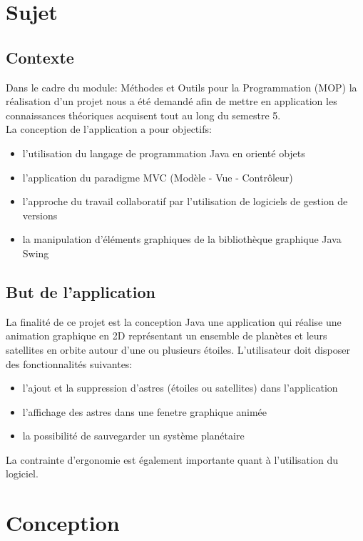 \documentclass[a4paper,10pt]{article}
\begin{document}
\newpage
\tableofcontents
\newpage

\section{Sujet}
\subsection{Contexte}
Dans le cadre du module: Méthodes et Outils pour la Programmation (MOP) la réalisation d'un projet nous a été demandé afin de mettre
en application les connaissances théoriques acquisent tout au long du semestre 5. \\
La conception de l'application a pour objectifs:
\begin{itemize}
  \item l'utilisation du langage de programmation Java en orienté objets
  \item l'application du paradigme MVC (Modèle - Vue - Contrôleur)
  \item l'approche du travail collaboratif par l'utilisation de logiciels de gestion de versions
  \item la manipulation d'éléments graphiques de la bibliothèque graphique Java Swing
\end{itemize}

\subsection{But de l'application}
La finalité de ce projet est la conception Java une application qui réalise une animation graphique en 2D 
représentant un ensemble de planètes et leurs satellites en orbite autour d'une ou plusieurs étoiles.
L'utilisateur doit disposer des fonctionnalités suivantes:
\begin{itemize}
  \item l'ajout et la suppression d'astres (étoiles ou satellites) dans l'application
  \item l'affichage des astres dans une fenetre graphique animée
  \item la possibilité de sauvegarder un système planétaire 
\end{itemize}
La contrainte d'ergonomie est également importante quant à l'utilisation du logiciel.

\section{Conception}
\end{document}
